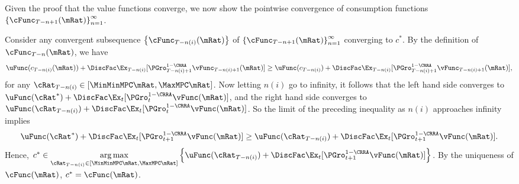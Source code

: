 \documentclass[\econtexRoot/ProjectMMD]{subfiles}
\begin{document}
Given the proof that the value functions converge, we now show the
pointwise convergence of consumption functions
$\left\{\cFunc_{T-n+1}(\mRat)\right\} _{n=1}^{\infty }$.

Consider any convergent subsequence $\left\{\cFunc_{T-n(i)}(\mRat)\right\}$ of $\left\{\cFunc_{T-n+1}(\mRat)\right\} _{n=1}^{\infty }$ converging to $c^*$. By the definition of $\cFunc_{T-n}(\mRat)$, we have 
\begin{equation}
    \uFunc(c_{T - n(i)}(\mRat)) + \DiscFac \Ex_{T - n(i)}[{\PGro}_{T-n(i)+1}^{1 - \CRRA}\vFunc_{T-n(i)+1}(\mRat)] \geq \uFunc(c_{T - n(i)}) + \DiscFac \Ex_{T - n(i)}[{\PGro}_{T-n(i)+1}^{1 - \CRRA}\vFunc_{T-n(i)+1}(\mRat)],
\end{equation}
for any $\cRat_{T - n(i)} \in [\MinMinMPC \mRat,\MaxMPC \mRat]$. Now letting $n(i)$ go to infinity, it follows that the left hand side converges to $\uFunc(\cRat^*) + \DiscFac \Ex_{t}[{\PGro}_{t}^{1 - \CRRA}\vFunc(\mRat)]$, and the right hand side converges to $\uFunc(\cRat_{T - n(i)}) + \DiscFac \Ex_{t}[{\PGro}_{t}^{1 - \CRRA}\vFunc(\mRat)]$. So the limit of the preceding inequality as $n(i)$ approaches infinity implies 
\begin{equation}
   \uFunc(\cRat^*) + \DiscFac \Ex_{t}[{\PGro}_{t + 1}^{1 - \CRRA}\vFunc(\mRat)] \geq \uFunc(\cRat_{T - n(i)}) + \DiscFac \Ex_{t}[{\PGro}_{t + 1}^{1 - \CRRA}\vFunc(\mRat)].
\end{equation}
Hence, $c^* \in \underset{\cRat_{T - n(i)} \in [\MinMinMPC \mRat,\MaxMPC \mRat]}{\arg \max }\left\{ \uFunc(\cRat_{T - n(i)}) + \DiscFac \Ex_{t}[{\PGro}_{t + 1}^{1 - \CRRA}\vFunc(\mRat)]\right\}$. By the uniqueness of $\cFunc(\mRat)$, $c^* = \cFunc(\mRat)$.
\end{document}
